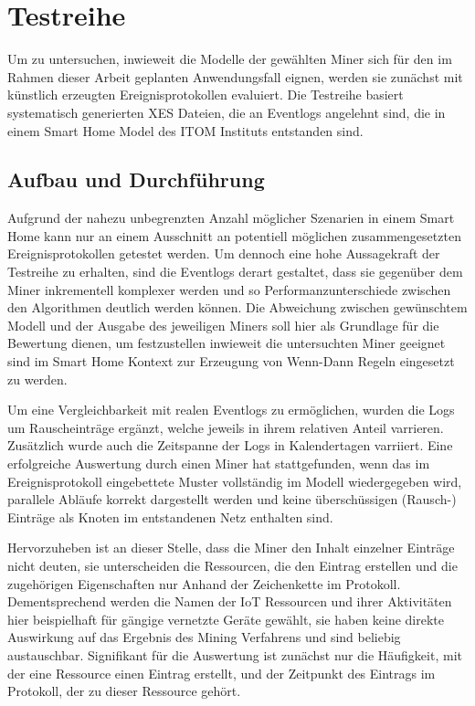 \newpage
\section{Testreihe}
Um zu untersuchen, inwieweit die Modelle der gewählten Miner sich für den im Rahmen dieser Arbeit geplanten Anwendungsfall eignen, werden sie zunächst mit künstlich erzeugten Ereignisprotokollen evaluiert. Die Testreihe basiert systematisch generierten XES Dateien, die an Eventlogs angelehnt sind, die in einem Smart Home Model des ITOM Instituts entstanden sind. 

\subsection{Aufbau und Durchführung}
Aufgrund der nahezu unbegrenzten Anzahl möglicher Szenarien in einem Smart Home kann nur an einem Ausschnitt an potentiell möglichen zusammengesetzten Ereignisprotokollen getestet werden. Um dennoch eine hohe Aussagekraft der Testreihe zu erhalten, sind die Eventlogs derart gestaltet, dass sie gegenüber dem Miner inkrementell komplexer werden und so Performanzunterschiede zwischen den Algorithmen deutlich werden können. Die Abweichung zwischen gewünschtem Modell und der Ausgabe des jeweiligen Miners soll hier als Grundlage für die Bewertung dienen, um festzustellen inwieweit die untersuchten Miner geeignet sind im Smart Home Kontext zur Erzeugung von Wenn-Dann Regeln eingesetzt zu werden. 

Um eine Vergleichbarkeit mit realen Eventlogs zu ermöglichen, wurden die Logs um Rauscheinträge ergänzt, welche jeweils in ihrem relativen Anteil varrieren. Zusätzlich wurde auch die Zeitspanne der Logs in Kalendertagen varriiert. Eine erfolgreiche Auswertung durch einen Miner hat stattgefunden, wenn das im Ereignisprotokoll eingebettete Muster vollständig im Modell wiedergegeben wird, parallele Abläufe korrekt dargestellt werden und keine überschüssigen (Rausch-) Einträge als Knoten im entstandenen Netz enthalten sind.

Hervorzuheben ist an dieser Stelle, dass die Miner den Inhalt einzelner Einträge nicht deuten, sie unterscheiden die Ressourcen, die den Eintrag erstellen und die zugehörigen Eigenschaften nur Anhand der Zeichenkette im Protokoll. Dementsprechend werden die Namen der IoT Ressourcen und ihrer Aktivitäten hier beispielhaft für gängige vernetzte Geräte gewählt, sie haben keine direkte Auswirkung auf das Ergebnis des Mining Verfahrens und sind beliebig austauschbar. Signifikant für die Auswertung ist zunächst nur die Häufigkeit, mit der eine Ressource einen Eintrag erstellt, und der Zeitpunkt des Eintrags im Protokoll, der zu dieser Ressource gehört.


